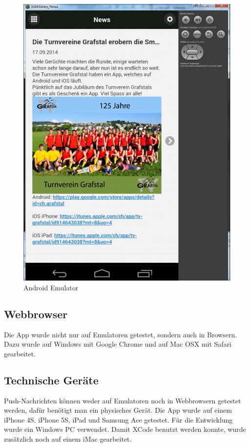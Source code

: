 \begin{figure}[h]
\centering
\includegraphics[scale=0.25]{images/android_emulator.png}
\caption{Android Emulator}
\label{fig:android_emulator}
\end{figure}

\FloatBarrier
\subsection{Webbrowser}
Die App wurde nicht nur auf Emulatoren getestet, sondern auch in Browsern. Dazu wurde auf Windows mit Google Chrome und auf Mac OSX mit Safari gearbeitet.

\subsection{Technische Geräte}
Push-Nachrichten können weder auf Emulatoren noch in Webbrowsern getestet werden, dafür benötigt man ein physisches Gerät. Die App wurde auf einem iPhone 4S, iPhone 5S, iPad und Samsung Ace getestet. Für die Entwicklung wurde ein Windows PC verwendet. Damit XCode benutzt werden konnte, wurde zusätzlich noch auf einem iMac gearbeitet.

